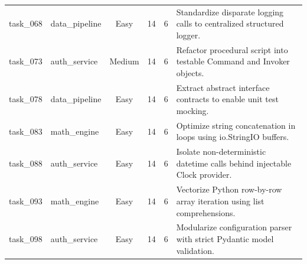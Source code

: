 \begin{table}[t]
\begin{tabular}{llcccl}
task\_068 & data\_pipeline & Easy & 14 & 6 & Standardize disparate logging calls to centralized structured logger. \\
task\_073 & auth\_service & Medium & 14 & 6 & Refactor procedural script into testable Command and Invoker objects. \\
task\_078 & data\_pipeline & Easy & 14 & 6 & Extract abstract interface contracts to enable unit test mocking. \\
task\_083 & math\_engine & Easy & 14 & 6 & Optimize string concatenation in loops using io.StringIO buffers. \\
task\_088 & auth\_service & Easy & 14 & 6 & Isolate non-deterministic datetime calls behind injectable Clock provider. \\
task\_093 & math\_engine & Easy & 14 & 6 & Vectorize Python row-by-row array iteration using list comprehensions. \\
task\_098 & auth\_service & Easy & 14 & 6 & Modularize configuration parser with strict Pydantic model validation. \\
\bottomrule
\end{tabular}
\end{table}

